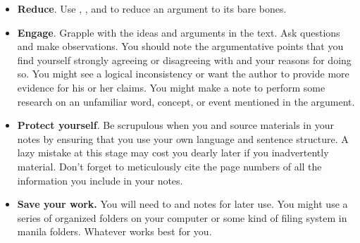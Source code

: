 \begin{itemize} \item \textbf{Reduce}. Use \hyperlink{summary}{\color{Ahrenge}{summary}}, \hyperlink{paraphrase}{\color{Ahrenge}{paraphrase}}, and \hyperlink{quotation}{\color{Ahrenge}{quotation}} to reduce an argument to its bare
bones.

\item \textbf{Engage}. Grapple with the ideas and arguments in the text. Ask
questions and make observations. You should note the argumentative points that
you find yourself strongly agreeing or disagreeing with and your reasons for
doing so. You might see a logical inconsistency or want the author to provide
more evidence for his or her claims. You might make a note to perform some
research on an unfamiliar word, concept, or event mentioned in the argument.

\item \textbf{Protect yourself}. Be scrupulous when you \hyperlink{summary}{\color{Ahrenge}{summarize}} and \hyperlink{paraphrase}{\color{Ahrenge}{paraphrase}}
source materials in your notes by ensuring that you use your own language and
sentence structure. A lazy mistake at this stage may cost you dearly later if
you inadvertently \hyperlink{plagiarism}{\color{Ahrenge}{plagiarize}} material. Don't forget to meticulously cite the page numbers of all the information you include in your notes.

\item \textbf{Save your work.} You will need to \hyperlink{joyofreuse}{\color{Ahrenge}{create a system for organizing and retaining these annotations}} and notes for later use. You might use a series of organized folders on your computer or some kind of filing system in manila folders. Whatever works best for you. 

\end{itemize}
